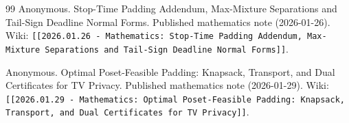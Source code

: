 \documentclass[11pt]{article}
\begin{document}
\begin{thebibliography}{99}
Anonymous.
\newblock Stop-Time Padding Addendum, Max-Mixture Separations and Tail-Sign Deadline Normal Forms.
\newblock Published mathematics note (2026-01-26). Wiki: \texttt{[[2026.01.26 - Mathematics: Stop-Time Padding Addendum, Max-Mixture Separations and Tail-Sign Deadline Normal Forms]]}.

Anonymous.
\newblock Optimal Poset-Feasible Padding: Knapsack, Transport, and Dual Certificates for TV Privacy.
\newblock Published mathematics note (2026-01-29). Wiki: \texttt{[[2026.01.29 - Mathematics: Optimal Poset-Feasible Padding: Knapsack, Transport, and Dual Certificates for TV Privacy]]}.

\end{thebibliography}
\end{document}
